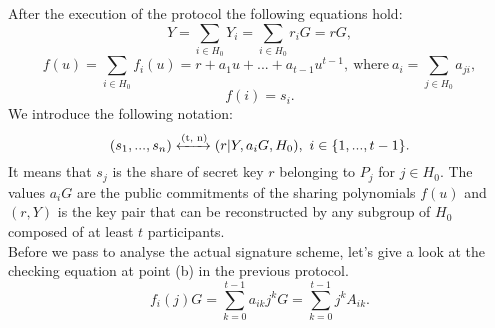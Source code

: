 After the execution of the protocol the following equations hold:
$$Y = \sum_{i \in H_0} Y_i = \sum_{i \in H_0}r_iG = rG,$$
$$f(u) = \sum_{i \in H_0} f_i(u) = r + a_1u + ... + a_{t - 1}u^{t - 1}, \ \text{where} \ a_i = \sum_{j \in H_0}a_{ji},$$
$$f(i) = s_i.$$
We introduce the following notation: 
$$(s_1, ..., s_n) \xleftrightarrow{\text{(t, n)}} (r|Y, a_iG, H_0), \ i \in \{1, ..., t - 1\}.$$
It means that $s_j$ is the share of secret key $r$ belonging to $P_j$ for $j \in H_0$. The values $a_iG$
are the public commitments of the sharing polynomials $f(u)$ and $(r, Y)$ is the key pair that can be reconstructed by any subgroup of $H_0$ composed of at least $t$ participants. 
\\
Before we pass to analyse the actual signature scheme, let's give a look at the checking equation at point (b) in the previous protocol.
$$f_i(j)G = \sum_{k = 0}^{t - 1}a_{ik}j^kG = \sum_{k = 0}^{t - 1}j^kA_{ik}.$$

